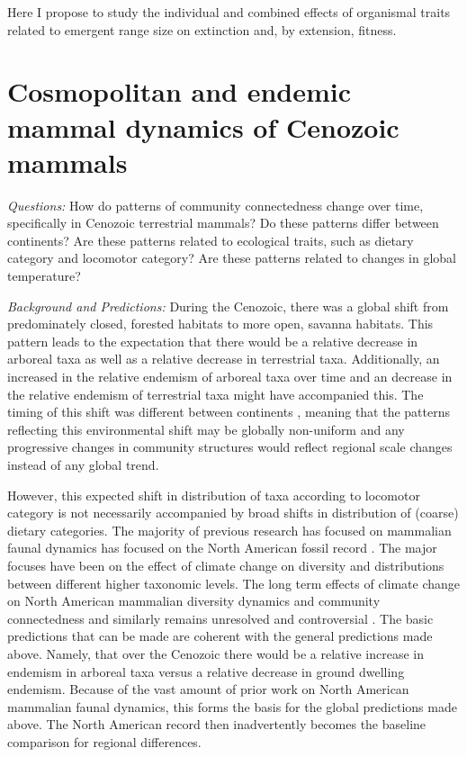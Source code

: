 \documentclass[12pt,letterpaper]{article}
\begin{document}
Here I propose to study the individual and combined effects of organismal traits related to emergent range size on extinction and, by extension, fitness.


\section{Cosmopolitan and endemic mammal dynamics of Cenozoic mammals}

\textit{Questions:} How do patterns of community connectedness change over time, specifically in Cenozoic terrestrial mammals? Do these patterns differ between continents? Are these patterns related to ecological traits, such as dietary category and locomotor category? Are these patterns related to changes in global temperature?

\textit{Background and Predictions:}
During the Cenozoic, there was a global shift from predominately closed, forested habitats to more open, savanna habitats. This pattern leads to the expectation that there would be a relative decrease in arboreal taxa as well as a relative decrease in terrestrial taxa. Additionally, an increased in the relative endemism of arboreal taxa over time and an decrease in the relative endemism of terrestrial taxa might have accompanied this. The timing of this shift was different between continents \citep{Stromberg2005,Stromberg2013}, meaning that the patterns reflecting this environmental shift may be globally non-uniform and any progressive changes in community structures would reflect regional scale changes instead of any global trend.

However, this expected shift in distribution of taxa according to locomotor category is not necessarily accompanied by broad shifts in distribution of (coarse) dietary categories. The majority of previous research has focused on mammalian faunal dynamics has focused on the North American fossil record \citep{Alroy2000g,Alroy1996a,Alroy1998,Barnosky2001a,Simpson1944,Simpson1953,Badgley2013,Blois2009,Figueirido2012,Gunnell1995,Hadly2001}. The major focuses have been on the effect of climate change on diversity and distributions between different higher taxonomic levels. The long term effects of climate change on North American mammalian diversity dynamics and community connectedness and similarly remains unresolved and controversial \citep{Alroy2000g,Blois2009,Figueirido2012,Barnosky2001a}. The basic predictions that can be made are coherent with the general predictions made above. Namely, that over the Cenozoic there would be a relative increase in endemism in arboreal taxa versus a relative decrease in ground dwelling endemism. Because of the vast amount of prior work on North American mammalian faunal dynamics, this forms the basis for the global predictions made above. The North American record then inadvertently becomes the baseline comparison for regional differences.
\end{document}
